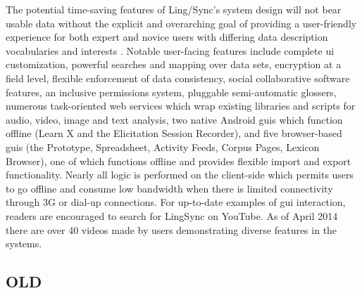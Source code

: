 \documentclass[11pt]{article}
\begin{document}
The potential time-saving features of Ling\-/Sync's system design will not bear
usable data without the explicit and overarching goal of providing a
user-friendly experience for both expert and novice users with differing data
description vocabularies and interests \cite{Troy:2014}.  Notable user-facing
features include complete \gls{ui} customization, powerful searches and mapping over
data sets, encryption at a field level, flexible enforcement of data
consistency, social collaborative software features, an inclusive permissions
system, pluggable 
semi-automatic glossers, numerous task-oriented web services which wrap
existing libraries and scripts for audio, video, image and text analysis, two
native Android \glspl{gui} which function offline (Learn X and the Elicitation
Session Recorder), and five browser-based \glspl{gui} (the Prototype,
Spreadsheet,  Activity Feeds, Corpus Pages, Lexicon Browser), one of which
functions offline and provides flexible import and export functionality. 
%
%
Nearly all logic is performed on
the client-side which permits users to go offline and consume low bandwidth
when there is limited connectivity through 3G or dial-up connections.
%
For up-to-date examples of \gls{gui} interaction, readers are encouraged to
search for LingSync on YouTube. As of April 2014 there are over 40 videos made
by users demonstrating diverse features in the systems.



\subsection{OLD}\label{sec:old}
\end{document}
